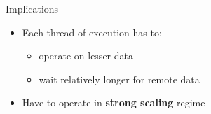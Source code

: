 \begin{frame}[shrink]
    \pause
    \begin{block}{Implications}
        \begin{itemize}
            \item Each thread of execution has to:
                \begin{itemize}
                    \item operate on lesser data
                    \item wait relatively longer for remote data
                \end{itemize}
            \item Have to operate in \textbf{strong scaling} regime
        \end{itemize}
    \end{block}
\end{frame}


